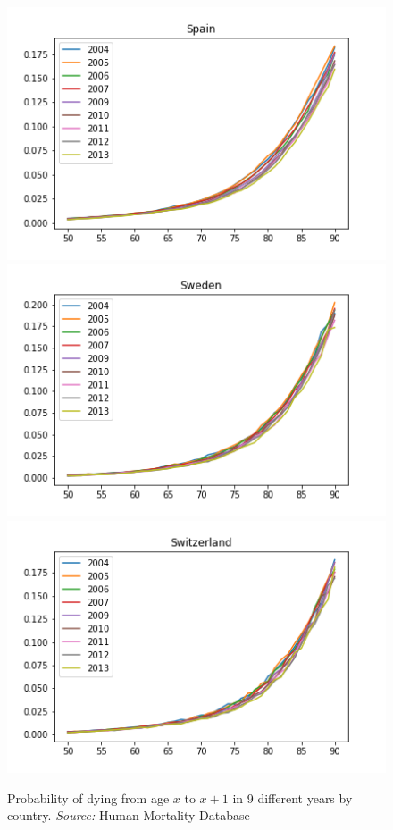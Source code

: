 \begin{figure}[H]
\endminipage\hfill
{}
  \includegraphics[width=\linewidth]{images/mortality_male_7.png}
\endminipage\hfill
{}
  \includegraphics[width=\linewidth]{images/mortality_male_8.png}
\endminipage\hfill
{}%
  \includegraphics[width=\linewidth]{images/mortality_male_9.png}
\endminipage\hfill
\label{dying_male}
\caption{Probability of dying from age $x$ to $x+1$ in 9 different years by country. \textit{Source:} Human Mortality Database}
\end{figure}



